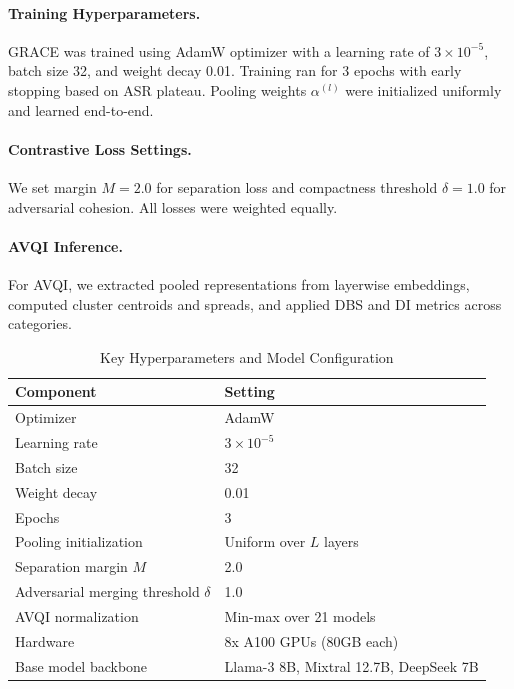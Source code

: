 \paragraph{Training Hyperparameters.} GRACE was trained using AdamW optimizer with a learning rate of $3\times10^{-5}$, batch size 32, and weight decay 0.01. Training ran for 3 epochs with early stopping based on ASR plateau. Pooling weights \( \alpha^{(l)} \) were initialized uniformly and learned end-to-end.

\paragraph{Contrastive Loss Settings.} We set margin $M=2.0$ for separation loss and compactness threshold $\delta=1.0$ for adversarial cohesion. All losses were weighted equally.

\paragraph{AVQI Inference.} For AVQI, we extracted pooled representations from layerwise embeddings, computed cluster centroids and spreads, and applied DBS and DI metrics across categories.

\begin{table}[h!]
\centering
\footnotesize
\caption{Key Hyperparameters and Model Configuration}
\label{tab:grace_hyperparams}
\begin{tabular}{l|l}
\toprule
\textbf{Component} & \textbf{Setting} \\
\midrule
Optimizer & AdamW \\
Learning rate & $3\times10^{-5}$ \\
Batch size & 32 \\
Weight decay & 0.01 \\
Epochs & 3 \\
Pooling initialization & Uniform over $L$ layers \\
Separation margin $M$ & 2.0 \\
Adversarial merging threshold $\delta$ & 1.0 \\
AVQI normalization & Min-max over 21 models \\
Hardware & 8x A100 GPUs (80GB each) \\
Base model backbone & Llama-3 8B, Mixtral 12.7B, DeepSeek 7B \\
\bottomrule
\end{tabular}
\end{table}

